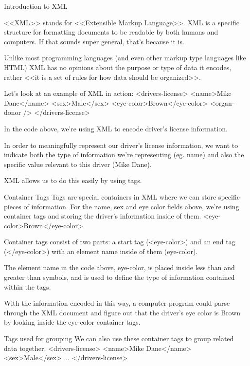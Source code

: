 Introduction to XML

        <<XML>> stands for <<Extensible Markup Language>>. XML is a specific structure for formatting documents to be readable by both humans and computers. If that sounds super general, that’s because it is.

        Unlike most programming languages (and even other markup type languages like HTML) XML has no opinions about the purpose or type of data it encodes, rather <<it is a set of rules for how data should be organized>>.

        Let’s look at an example of XML in action:
            <drivers-license>
                <name>Mike Dane</name>
                <sex>Male</sex>
                <eye-color>Brown</eye-color>
                <organ-donor />
            </drivers-license>

        In the code above, we’re using XML to encode driver’s license information.

        In order to meaningfully represent our driver’s license information, we want to indicate both the type of information we’re representing (eg. name) and also the specific value relevant to this driver (Mike Dane).

        XML allows us to do this easily by using tags.

Container Tags
        Tags are special containers in XML where we can store specific pieces of information. For the name, sex and eye color fields above, we’re using container tags and storing the driver’s information inside of them.
            <eye-color>Brown</eye-color>
    
        Container tags consist of two parts: a start tag (<eye-color>) and an end tag (</eye-color>) with an element name inside of them (eye-color).

        The element name in the code above, eye-color, is placed inside less than and greater than symbols, and is used to define the type of information contained within the tags.

        With the information encoded in this way, a computer program could parse through the XML document and figure out that the driver’s eye color is Brown by looking inside the eye-color container tags.

    Tags used for grouping
        We can also use these container tags to group related data together.
            <drivers-license>
                <name>Mike Dane</name>
                <sex>Male</sex>
                ...
            </drivers-license>

